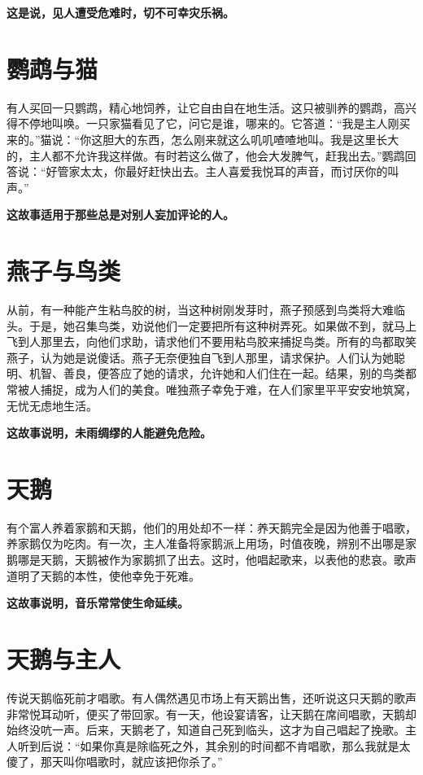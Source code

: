 {\bfseries \color{red}这是说，见人遭受危难时，切不可幸灾乐祸。}

\section{鹦鹉与猫}

有人买回一只鹦鹉，精心地饲养，让它自由自在地生活。这只被驯养的鹦鹉，高兴得不停地叫唤。一只家猫看见了它，问它是谁，哪来的。它答道：“我是主人刚买来的。”猫说：“你这胆大的东西，怎么刚来就这么叽叽喳喳地叫。我是这里长大的，主人都不允许我这样做。有时若这么做了，他会大发脾气，赶我出去。”鹦鹉回答说：“好管家太太，你最好赶快出去。主人喜爱我悦耳的声音，而讨厌你的叫声。”

{\bfseries \color{red}这故事适用于那些总是对别人妄加评论的人。}

\section{燕子与鸟类}

从前，有一种能产生粘鸟胶的树，当这种树刚发芽时，燕子预感到鸟类将大难临头。于是，她召集鸟类，劝说他们一定要把所有这种树弄死。如果做不到，就马上飞到人那里去，向他们求助，请求他们不要用粘鸟胶来捕捉鸟类。所有的鸟都取笑燕子，认为她是说傻话。燕子无奈便独自飞到人那里，请求保护。人们认为她聪明、机智、善良，便答应了她的请求，允许她和人们住在一起。结果，别的鸟类都常被人捕捉，成为人们的美食。唯独燕子幸免于难，在人们家里平平安安地筑窝，无忧无虑地生活。

{\bfseries \color{red}这故事说明，未雨绸缪的人能避免危险。}

\section{天鹅}

有个富人养着家鹅和天鹅，他们的用处却不一样：养天鹅完全是因为他善于唱歌，养家鹅仅为吃肉。有一次，主人准备将家鹅派上用场，时值夜晚，辨别不出哪是家鹅哪是天鹅，天鹅被作为家鹅抓了出去。这时，他唱起歌来，以表他的悲哀。歌声道明了天鹅的本性，使他幸免于死难。

{\bfseries \color{red}这故事说明，音乐常常使生命延续。}

\section{天鹅与主人}

传说天鹅临死前才唱歌。有人偶然遇见市场上有天鹅出售，还听说这只天鹅的歌声非常悦耳动听，便买了带回家。有一天，他设宴请客，让天鹅在席间唱歌，天鹅却始终没吭一声。后来，天鹅老了，知道自己死到临头，这才为自己唱起了挽歌。主人听到后说：“如果你真是除临死之外，其余别的时间都不肯唱歌，那么我就是太傻了，那天叫你唱歌时，就应该把你杀了。”

